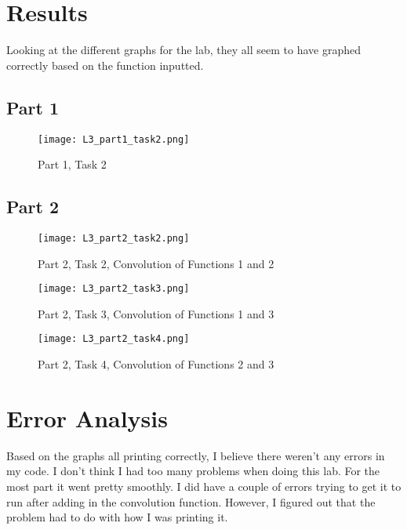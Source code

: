 \documentclass[12pt]{report}
\begin{document}
\section{Results}
Looking at the different graphs for the lab, they all seem to have graphed
correctly based on the function inputted.
\subsection{Part 1}
\begin{figure}[H]
\begin{center}
\caption{Part 1, Task 2}
\texttt{[image: L3\_part1\_task2.png]}
\end{center}
\end{figure}

\subsection{Part 2} {
\begin{figure}[H]
\begin{center}
\caption{Part 2, Task 2, Convolution of Functions 1 and 2}
\texttt{[image: L3\_part2\_task2.png]}
\end{center}
\end{figure}

\begin{figure}[H]
\begin{center}
\caption{Part 2, Task 3, Convolution of Functions 1 and 3}
\texttt{[image: L3\_part2\_task3.png]}
\end{center}
\end{figure}

\begin{figure}[H]
\begin{center}
\caption{Part 2, Task 4, Convolution of Functions 2 and 3}
\texttt{[image: L3\_part2\_task4.png]}
\end{center}
\end{figure}
}

\section{Error Analysis}
Based on the graphs all printing correctly, I believe there weren't
any errors in my code. I don't think I had too many problems
when doing this lab. For the most part it went pretty smoothly.
I did have a couple of errors trying to get it to run after
adding in the convolution function. However, I figured out that
the problem had to do with how I was printing it.
\end{document}
